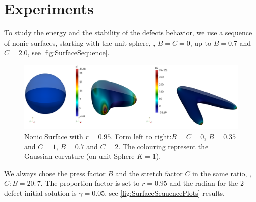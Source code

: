 \documentclass[a4paper,11pt]{scrartcl}
\newcommand{\pstretch}{C}
\newcommand{\pprop}{r}
\newcommand{\ppress}{B}
\begin{document}
\section{Experiments}
To study the energy and the stability of the defects behavior, 
we use a sequence of nonic surfaces, starting with the unit sphere,
\ie, \( \ppress=\pstretch=0 \), up to \( \ppress = 0.7 \) and \( \pstretch = 2.0 \), see \autoref{fig:SurfaceSequence}.
\begin{figure}
  \centering
  \includegraphics[width=.95\textwidth]{stuff/paraview/SurfaceSequence.png}
  \caption{Nonic Surface with \( \pprop = 0.95 \). 
            Form left to right:\( \ppress = \pstretch = 0 \), 
                               \( \ppress = 0.35 \) and \( \pstretch = 1 \),
                               \( \ppress = 0.7 \) and \( \pstretch = 2 \).
            The colouring represent the Gaussian curvature (on unit Sphere \( K=1  \)).
           }
  \label{fig:SurfaceSequence}
\end{figure}
We always chose the press factor \( \ppress \) and the stretch factor \( \pstretch \) in the same ratio,
\ie, \( C:B = 20:7 \).
The proportion factor is set to \( \pprop = 0.95 \) and the radian for the 2 defect initial solution is
\( \gamma = 0.05 \), see \autoref{fig:SurfaceSequencePlots} results.
\end{document}
